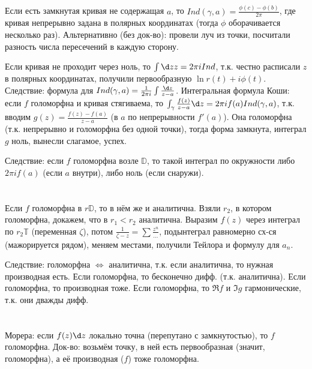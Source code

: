 \section{} %
	Если есть замкнутая кривая не содержащая $a$, то $Ind(\gamma, a)=\frac{\phi(c)-\phi(b)}{2\pi}$,
	где кривая непрерывно задана в полярных координатах (тогда $\phi$ оборачивается несколько раз).
	Альтернативно (без док-во): провели луч из точки, посчитали разность числа пересечений в каждую сторону.

	Если кривая не проходит через ноль, то $\int{\d z}{z}=2\pi i Ind$, т.к. честно расписали
	$z$ в полярных координатах, получили первообразную $\ln r(t) + i\phi(t)$.
	Следствие: формула для $Ind(\gamma, a)=\frac{1}{2\pi i}\int\frac{\d z}{z - a}$.
	Интегральная формула Коши: если $f$ голоморфна и кривая стягиваема,
	то $\int_{\gamma} \frac{f(z)}{z - a}\d z=2\pi i f(a) Ind(\gamma, a)$,
	т.к. вводим $g(z)=\frac{f(z)-f(a)}{z-a}$ (в $a$ по непрерывности $f'(a)$).
	Она голоморфна (т.к. непрерывно и голоморфна без одной точки), тогда форма замкнута,
	интеграл $g$ ноль, вынесли слагамое, успех.

	Следствие: если $f$ голоморфна возле $\mathbb{D}$, то такой интеграл по окружности
	либо $2\pi i f(a)$ (если $a$ внутри), либо ноль (если снаружи).

\section{} %
	Если $f$ голоморфна в $r\mathbb{D}$, то в нём же и аналитична.
	Взяли $r_2$, в котором голоморфна, докажем, что в $r_1<r_2$ аналитична.
	Выразим $f(z)$ через интеграл по $r_2\mathbb{T}$ (переменная $\zeta$), потом $\frac{1}{\zeta-z}=\sum \frac{z^n}{\dots}$,
	подынтеграл равномерно сх-ся (мажорируется рядом), меняем местами, получили Тейлора и формулу для $a_n$.

	Следствие: голоморфна $\iff$ аналитична, т.к. если аналитична, то нужная производная есть.
	Если голоморфна, то бесконечно дифф. (т.к. аналитична).
	Если голоморфна, то производная тоже.
	Если голоморфна, то $\Re f$ и $\Im g$ гармонические, т.к. они дважды дифф.

\section{} %
	Морера: если $f(z) \d z$ локально точна (перепутано с замкнутостью), то $f$ голоморфна.
	Док-во: возьмём точку, в ней есть первообразная (значит, голоморфна), а её производная ($f$) тоже голоморфна.

